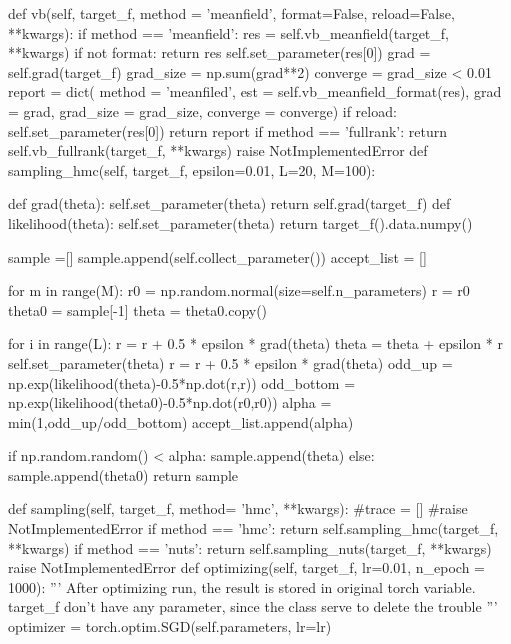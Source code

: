 \documentclass{article}
\begin{document}
\begin{python}
    def vb(self, target_f, method = 'meanfield', format=False, 
                 reload=False, **kwargs):
        if method == 'meanfield':
            res = self.vb_meanfield(target_f, **kwargs)
            if not format:
                return res
            self.set_parameter(res[0])
            grad = self.grad(target_f) 
            grad_size = np.sum(grad**2)
            converge = grad_size < 0.01
            report = dict( method = 'meanfiled', 
                           est = self.vb_meanfield_format(res),
                           grad = grad,
                           grad_size = grad_size,
                           converge = converge)
            if reload:
                self.set_parameter(res[0])
            return report
        if method == 'fullrank':
            return self.vb_fullrank(target_f, **kwargs)
        raise NotImplementedError
    def sampling_hmc(self, target_f, epsilon=0.01, L=20, M=100):
        
        def grad(theta):
            self.set_parameter(theta)
            return self.grad(target_f)
        def likelihood(theta):
            self.set_parameter(theta)
            return target_f().data.numpy()
        
        sample =[]
        sample.append(self.collect_parameter())
        accept_list = []
        
        for m in range(M):
            r0 = np.random.normal(size=self.n_parameters)
            r = r0
            theta0 = sample[-1]
            theta = theta0.copy()
            
            for i in range(L):
                r = r + 0.5 * epsilon * grad(theta)
                theta = theta + epsilon * r
                self.set_parameter(theta)
                r = r + 0.5 * epsilon * grad(theta)
            odd_up = np.exp(likelihood(theta)-0.5*np.dot(r,r))
            odd_bottom = np.exp(likelihood(theta0)-0.5*np.dot(r0,r0))
            alpha = min(1,odd_up/odd_bottom)
            accept_list.append(alpha)
            
            if np.random.random() < alpha:
                sample.append(theta)
            else:
                sample.append(theta0)
        return sample
        

    def sampling(self, target_f, method= 'hmc', **kwargs):
        #trace = []
        #raise NotImplementedError
        if method == 'hmc':
            return self.sampling_hmc(target_f, **kwargs)
        if method == 'nuts':
            return self.sampling_nuts(target_f, **kwargs)
        raise NotImplementedError
    def optimizing(self, target_f, lr=0.01, n_epoch = 1000):
        '''
        After optimizing run, the result is stored in original torch variable.
        target_f don't have any parameter, since the class serve to delete the trouble
        '''
        optimizer = torch.optim.SGD(self.parameters, lr=lr)
        

\end{python}
\end{document}
